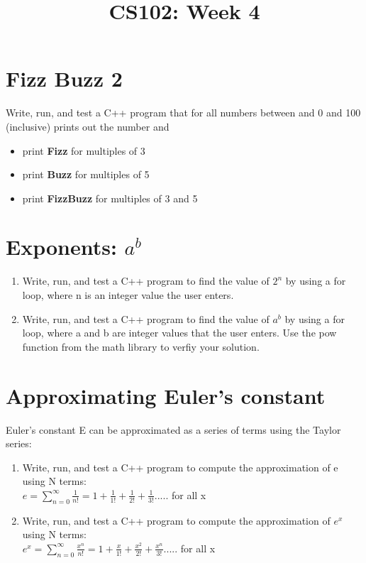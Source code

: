 \documentclass{article}
\begin{document}
\title{CS102: Week 4}

\maketitle

\section*{Fizz Buzz 2}
Write, run, and test a C++ program that for all numbers between and 0 and 100 (inclusive) prints out the number and
\begin{itemize}
	\item print \textbf{Fizz} for multiples of 3
	\item print \textbf{Buzz} for multiples of 5
	\item print \textbf{FizzBuzz} for multiples of 3 and 5
\end{itemize}


\section*{Exponents: $a^{b}$}
\begin{enumerate}
	\item Write, run, and test a C++ program to find the value of $2^{n}$ by using a for loop, where n is an integer value the user
enters.
	\item Write, run, and test a C++ program to find the value of $a^{b}$  by using a for loop, where a and b are integer values that the user enters. Use the pow function from the math library to verfiy your solution.
\end{enumerate}

\section*{Approximating Euler's constant}
Euler's constant E can be approximated as a series of terms using the Taylor series:\\

\begin{enumerate}

\item Write, run, and test a C++ program to compute the approximation of e using N terms:\\
$e = \displaystyle \sum^{\infty  }_{n=0}\frac{1}{n!} = 1 + \frac{1}{1!} + \frac{1}{2!} + \frac{1}{3!} .....$ for all x
\item Write, run, and test a C++ program to compute the approximation of $e^{x}$ using N terms:\\
$e^{x}=\displaystyle \sum^{\infty}_{n=0}\frac{x^{n}}{n!} = 1 + \frac{x}{1!} + \frac{x^{2}}{2!} + \frac{x^{n}}{3!}.....$ for all x
\end{enumerate}
\end{document}
